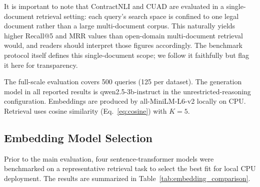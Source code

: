 \documentclass[conference]{IEEEtran}
\begin{document}
It is important to note that ContractNLI and CUAD are evaluated in a single-document retrieval setting: each query's search space is confined to one legal document rather than a large multi-document corpus. This naturally yields higher Recall@5 and MRR values than open-domain multi-document retrieval would, and readers should interpret those figures accordingly. The benchmark protocol itself defines this single-document scope; we follow it faithfully but flag it here for transparency.

The full-scale evaluation covers 500 queries (125 per dataset). The generation model in all reported results is qwen2.5-3b-instruct in the unrestricted-reasoning configuration. Embeddings are produced by all-MiniLM-L6-v2 locally on CPU. Retrieval uses cosine similarity (Eq.~\ref{eq:cosine}) with $K = 5$.

\subsection{Embedding Model Selection}
\label{sec:embedding_ablation}

Prior to the main evaluation, four sentence-transformer models were benchmarked on a representative retrieval task to select the best fit for local CPU deployment. The results are summarized in Table~\ref{tab:embedding_comparison}.

\begin{table}[!t]
\centering
\caption{Embedding Model Comparison for Local CPU Deployment. \textbf{Bold} indicates the model selected for the deployed system. Load time is the one-time model initialization cost; query and embed times are per-inference averages.}
\label{tab:embedding_comparison}
\renewcommand{\arraystretch}{1.2}
\end{table}
\end{document}
